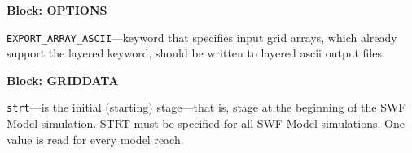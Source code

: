 
\item \textbf{Block: OPTIONS}

\begin{description}
\item \texttt{EXPORT\_ARRAY\_ASCII}---keyword that specifies input grid arrays, which already support the layered keyword, should be written to layered ascii output files.

\end{description}
\item \textbf{Block: GRIDDATA}

\begin{description}
\item \texttt{strt}---is the initial (starting) stage---that is, stage at the beginning of the SWF Model simulation.  STRT must be specified for all SWF Model simulations. One value is read for every model reach.

\end{description}

